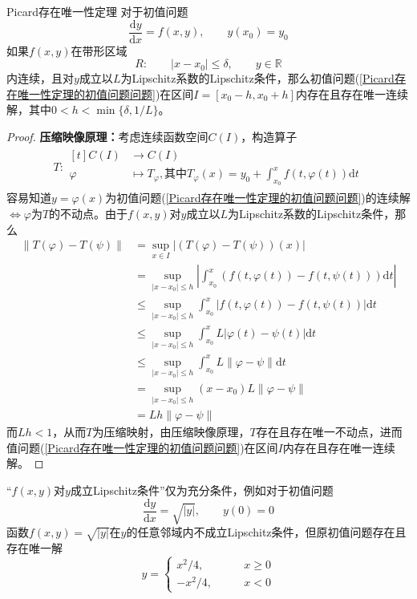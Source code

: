 \documentclass[lang = cn, scheme = chinese, thmcnt = section]{elegantbook}
\newcommand{\R}{\mathbb{R}}            %
\newcommand{\dd}{\mathrm{d}}           %
\begin{document}
\begin{theorem}{Picard存在唯一性定理}
	对于初值问题
	\begin{equation*}
		\frac{\dd y}{\dd x}=f(x,y),\qquad 
		y(x_0)=y_0
		\label{Picard存在唯一性定理的初值问题问题}
		\tag{*}
	\end{equation*}
	如果$f(x,y)$在带形区域
	$$
	R:\qquad 
	|x-x_0|\le \delta,\qquad 
	y\in\R
	$$
	内连续，且对$y$成立以$L$为Lipschitz系数的Lipschitz条件，那么初值问题(\ref{Picard存在唯一性定理的初值问题问题})在区间$I=[x_0-h,x_0+h]$内存在且存在唯一连续解，其中$0<h<\min\{ \delta,1/L \}$。
\end{theorem}

\begin{proof}
	{\bf 压缩映像原理：}考虑连续函数空间$C(I)$，构造算子
	\begin{align*}
		T:\begin{aligned}[t]
			C(I) &\longrightarrow C(I)\\
			\varphi &\longmapsto T_\varphi,\text{其中}T_\varphi(x)=y_0+\int_{x_0}^{x}f(t,\varphi(t))\dd t
		\end{aligned}
	\end{align*}
	容易知道$y=\varphi(x)$为初值问题(\ref{Picard存在唯一性定理的初值问题问题})的连续解$\iff \varphi$为$T$的不动点。由于$f(x,y)$对$y$成立以$L$为Lipschitz系数的Lipschitz条件，那么
	\begin{align*}
		\| T(\varphi)-T(\psi) \|
		& = \sup_{x\in I}|(T(\varphi)-T(\psi))(x)| \\
		& = \sup_{|x-x_0|\le h}\left| \int_{x_0}^{x}(f(t,\varphi(t))-f(t,\psi(t)))\dd t \right| \\
		& \le \sup_{|x-x_0|\le h} \int_{x_0}^{x}|f(t,\varphi(t))-f(t,\psi(t))|\dd t \\
		& \le \sup_{|x-x_0|\le h} \int_{x_0}^{x}L|\varphi(t)-\psi(t)|\dd t \\
		& \le \sup_{|x-x_0|\le h} \int_{x_0}^{x}L\|\varphi-\psi\|\dd t \\
		& = \sup_{|x-x_0|\le h} (x-x_0)L\|\varphi-\psi\| \\
		& = Lh\|\varphi-\psi\|
	\end{align*}
	而$Lh<1$，从而$T$为压缩映射，由压缩映像原理，$T$存在且存在唯一不动点，进而值问题(\ref{Picard存在唯一性定理的初值问题问题})在区间$I$内存在且存在唯一连续解。
\end{proof}

\begin{note}
	“$f(x,y)$对$y$成立Lipschitz条件”仅为充分条件，例如对于初值问题
	$$
	\frac{\dd y}{\dd x}=\sqrt{|y|},\qquad 
	y(0)=0
	$$
	函数$f(x,y)=\sqrt{|y|}$在$y$的任意邻域内不成立Lipschitz条件，但原初值问题存在且存在唯一解
	$$
	y=\begin{cases}
		x^2/4,\qquad & x\ge 0\\
		-x^2/4,\qquad & x<0
	\end{cases}
	$$
\end{note}
\end{document}

